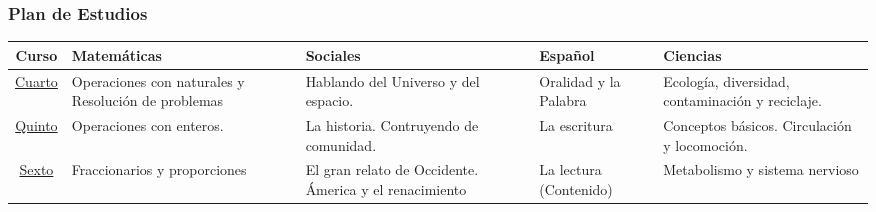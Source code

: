 \documentclass{beamer}
\begin{document}
\begin{frame}
\fontsize{9pt}{10}\selectfont
\frametitle{Plan de Estudios}
\begin{table}
\centering
\begin{tabular}{|c|p{2cm}|p{2cm}|p{2cm}|p{2cm}|}
\hline 
\textbf{Curso} & \textbf{Matem\'aticas} &\textbf{Sociales} &\textbf{Espa\~nol} & \textbf{Ciencias}\\
\hline
\underline{Cuarto} & Operaciones con naturales y Resoluci\'on de problemas   & Hablando del Universo y del espacio.  & Oralidad y la Palabra & Ecolog\'ia, diversidad, contaminaci\'on y reciclaje.  \\
\underline{Quinto} & Operaciones con enteros.  & La historia. Contruyendo de comunidad. & La escritura &Conceptos b\'asicos. Circulaci\'on y locomoci\'on.  \\
\underline{Sexto} & Fraccionarios y proporciones & El gran relato de Occidente. \'America y el renacimiento  & La lectura (Contenido)  & Metabolismo y sistema nervioso \\
\hline
\end{tabular}
\end{table}
\end{frame}
\end{document}
